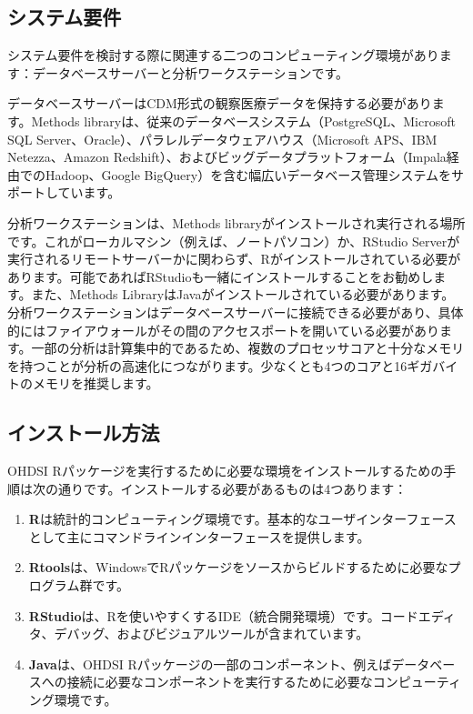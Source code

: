 \documentclass[
  11pt]{book}
\providecommand{\tightlist}{%
  \setlength{\itemsep}{0pt}\setlength{\parskip}{0pt}}
\theoremstyle{definition}
\theoremstyle{definition}
\theoremstyle{definition}
\theoremstyle{definition}
\theoremstyle{remark}
\begin{document}
\subsection{システム要件}\label{ux30b7ux30b9ux30c6ux30e0ux8981ux4ef6}

システム要件を検討する際に関連する二つのコンピューティング環境があります：データベースサーバーと分析ワークステーションです。 

データベースサーバーはCDM形式の観察医療データを保持する必要があります。Methods libraryは、従来のデータベースシステム（PostgreSQL、Microsoft SQL Server、Oracle）、パラレルデータウェアハウス（Microsoft APS、IBM Netezza、Amazon Redshift）、およびビッグデータプラットフォーム（Impala経由でのHadoop、Google BigQuery）を含む幅広いデータベース管理システムをサポートしています。

分析ワークステーションは、Methods libraryがインストールされ実行される場所です。これがローカルマシン（例えば、ノートパソコン）か、RStudio Serverが実行されるリモートサーバーかに関わらず、Rがインストールされている必要があります。可能であればRStudioも一緒にインストールすることをお勧めします。また、Methods LibraryはJavaがインストールされている必要があります。分析ワークステーションはデータベースサーバーに接続できる必要があり、具体的にはファイアウォールがその間のアクセスポートを開いている必要があります。一部の分析は計算集中的であるため、複数のプロセッサコアと十分なメモリを持つことが分析の高速化につながります。少なくとも4つのコアと16ギガバイトのメモリを推奨します。

\subsection{インストール方法}\label{installR}

OHDSI Rパッケージを実行するために必要な環境をインストールするための手順は次の通りです。インストールする必要があるものは4つあります： 

\begin{enumerate}
\def\labelenumi{\arabic{enumi}.}
\tightlist
\item
  \textbf{R}は統計的コンピューティング環境です。基本的なユーザインターフェースとして主にコマンドラインインターフェースを提供します。
\item
  \textbf{Rtools}は、WindowsでRパッケージをソースからビルドするために必要なプログラム群です。
\item
  \textbf{RStudio}は、Rを使いやすくするIDE（統合開発環境）です。コードエディタ、デバッグ、およびビジュアルツールが含まれています。
\item
  \textbf{Java}は、OHDSI Rパッケージの一部のコンポーネント、例えばデータベースへの接続に必要なコンポーネントを実行するために必要なコンピューティング環境です。
\end{enumerate}
\end{document}
